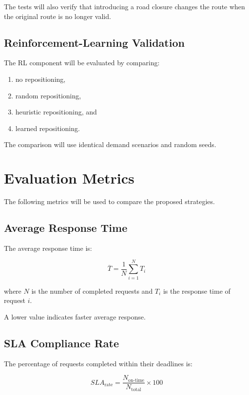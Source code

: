\documentclass[12pt,a4paper]{article}
\begin{document}
The tests will also verify that introducing a road closure changes
the route when the original route is no longer valid.

\subsection{Reinforcement-Learning Validation}

The RL component will be evaluated by comparing:

\begin{enumerate}
    \item no repositioning,
    \item random repositioning,
    \item heuristic repositioning, and
    \item learned repositioning.
\end{enumerate}

The comparison will use identical demand scenarios and random seeds.





\section{Evaluation Metrics}

The following metrics will be used to compare the proposed
strategies.

\subsection{Average Response Time}

The average response time is:

\begin{equation}
    \overline{T}
    =
    \frac{1}{N}
    \sum_{i=1}^{N}T_i
    \label{eq:avgresponse}
\end{equation}

where $N$ is the number of completed requests and $T_i$ is the
response time of request $i$.

A lower value indicates faster average response.

\subsection{SLA Compliance Rate}

The percentage of requests completed within their deadlines is:

\begin{equation}
    SLA_{\mathrm{rate}}
    =
    \frac{N_{\mathrm{on\text{-}time}}}
    {N_{\mathrm{total}}}
    \times 100
    \label{eq:sla}
\end{equation}
\end{document}
